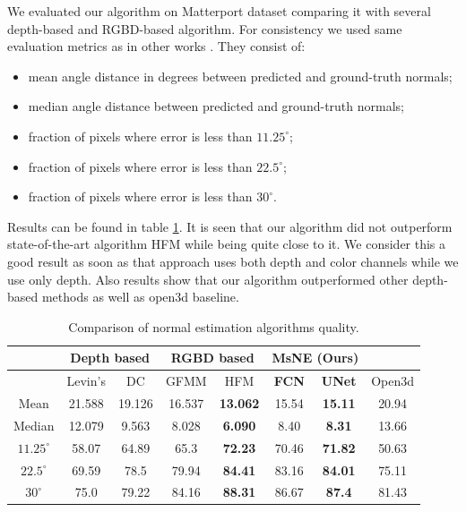 We evaluated our algorithm on Matterport dataset comparing it with several depth-based and RGBD-based algorithm. For consistency we used same evaluation metrics as in other works \cite{deep_surf, deep_depth_compl}. They consist of:
\begin{itemize}
    \item mean angle distance in degrees between predicted and ground-truth normals;
    \item median angle distance between predicted and ground-truth normals;
    \item fraction of pixels where error is less than $11.25^{\circ}$;
    \item fraction of pixels where error is less than $22.5^{\circ}$;
    \item fraction of pixels where error is less than $30^{\circ}$.
\end{itemize}

Results can be found in table \ref{table:qual}. It is seen that our algorithm did not outperform state-of-the-art algorithm HFM \cite{deep_surf} while being quite close to it. We consider this a good result as soon as that approach uses both depth and color channels while we use only depth. Also results show that our algorithm outperformed other depth-based methods as well as open3d baseline.

\begin{table}
\centering
\begin{tabular}{ | c | c | c | c | c | c | c | c | }
\hline
 & \multicolumn{2}{|c|}{Depth based} & \multicolumn{2}{|c|}{RGBD based} & \multicolumn{2}{|c|}{\textbf{MsNE (Ours)}} & \\
 \hline
 & Levin's \cite{colorization-using-optimization} & DC \cite{deep_depth_compl} & GFMM \cite{guided-depth-enhancement} & HFM \cite{deep_surf} & \textbf{FCN} & \textbf{UNet} & Open3d \cite{open3d} \\
 \hline
 Mean & 21.588  & 19.126 & 16.537 & \textbf{13.062} & 15.54 & \textbf{15.11} & 20.94 \\  
 \hline
 Median & 12.079  & 9.563 & 8.028 & \textbf{6.090} & 8.40 & \textbf{8.31} & 13.66 \\  
 \hline
 $11.25^{\circ}$ & 58.07  & 64.89 & 65.3 & \textbf{72.23} & 70.46 & \textbf{71.82} & 50.63\\
 \hline
 $22.5^{\circ}$ & 69.59 & 78.5 & 79.94 & \textbf{84.41} & 83.16 & \textbf{84.01} & 75.11 \\
 \hline
 $30^{\circ}$ & 75.0  & 79.22 & 84.16 & \textbf{88.31} & 86.67 & \textbf{87.4} & 81.43 \\
 \hline
\end{tabular}
\caption{Comparison of normal estimation algorithms quality.}
\label{table:qual}
\end{table}
